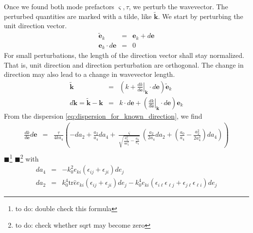 \documentclass[12pt,a4paper,twoside,openright,BCOR10mm,headsepline,titlepage,abstracton,chapterprefix,final]{scrreprt}
\newcommand\Vector[1]{{\mathbf{#1}}}
\newcommand\wavenumber{k}
\newcommand\Wavevector{\Vector{\wavenumber}}
\newcommand\Tensor[1]{\hat{#1}}
\newcommand\scalarrelativepermittivity{\epsilon}
\newcommand\relativepermittivity{\Tensor{\scalarrelativepermittivity}}
\newcommand{\remark}[1]{{\color{red}$\blacksquare$}\footnote{{\color{red}#1}}}
\begin{document}
Once we found both mode prefactors $\varsigma, \tau$, we perturb the wavevector. 
The perturbed quantities are marked with a tilde, like $\tilde{\Wavevector}$.
We start by perturbing the unit direction vector. 
\begin{eqnarray}
 \tilde{\Vector{e}}_\wavenumber &=& \Vector{e}_\wavenumber + d\Vector{e} \\
 \Vector{e}_\wavenumber \cdot d\Vector{e} &=& 0 \label{eq:perturbation_unit_orthogonality}
\end{eqnarray}
For small perturbations, the length of the direction vector shall stay normalized.
That is, unit direction and direction perturbation are orthogonal.
The change in direction may also lead to a change in wavevector length.
\begin{eqnarray}
 \tilde{\Wavevector} &=& 
     \left( 
         \wavenumber + \left. \frac{d \wavenumber}{d \Vector{e}}\right|_{\Wavevector} \cdot d\Vector{e} 
     \right)
     \tilde{\Vector{e}}_\wavenumber 
 \\
 d \Wavevector = \tilde{\Wavevector} - \Wavevector &=& \wavenumber \cdot d\Vector{e} + \left( \left. \frac{d \wavenumber}{d \Vector{e}}\right|_{\Wavevector} \cdot d\Vector{e} \right) \Vector{e}_\wavenumber
\end{eqnarray}
From the dispersion \ref{eq:dispersion_for_known_direction}, we find
\begin{eqnarray}
 \frac{d \wavenumber}{d \Vector{e}} d\Vector{e} &=&
     \frac{\tau}{4 \wavenumber a_4}
     \left(
         - d a_2 + \frac{a_2}{a_4} d a_4 
         +  \frac{\varsigma}{\sqrt{\frac{a_2^2}{4 a_4^2} - \frac{a_0}{a_4}}}
                \left( \frac{a_2}{2 a_4} d a_2 + \left( \frac{a_0}{a_4} - \frac{a_2^2}{2 a_4^2} \right) d a_4 \right)
     \right)
 \nonumber\\
\end{eqnarray}
\remark{to do: double check this formula}
\remark{to do: check whether sqrt may become zero}
with
\begin{eqnarray}
 d a_4 &=& - k_0^2  e_{ki} ( \scalarrelativepermittivity_{ij} + \scalarrelativepermittivity_{ji} ) de_{j} \\
 d a_2 &=&    k_0^4 \text{tr} \relativepermittivity e_{ki} ( \scalarrelativepermittivity_{ij} + \scalarrelativepermittivity_{ji} ) de_{j} - k_0^4 e_{ki} ( \scalarrelativepermittivity_{i\ell} \scalarrelativepermittivity_{\ell j} + \scalarrelativepermittivity_{j\ell} \scalarrelativepermittivity_{\ell i} ) de_j
\end{eqnarray}
\end{document}

